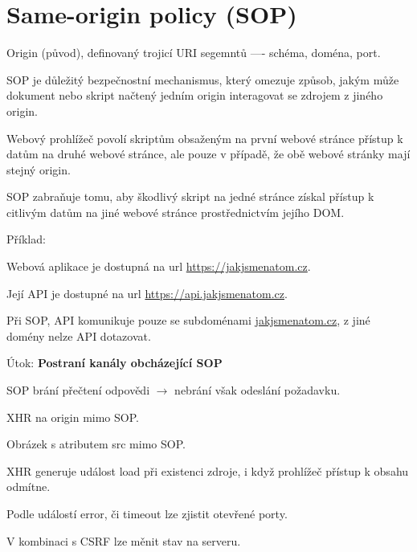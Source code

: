 
\section{Same-origin policy (SOP)}

\begin{compactitem}
    \item Origin (původ), definovaný trojicí URI segemntů ---- schéma, doména, port.

    \item SOP je důležitý bezpečnostní mechanismus, který omezuje způsob, jakým může dokument nebo skript načtený jedním origin interagovat se zdrojem z jiného origin. \begin{compactitem}
        \item Webový prohlížeč povolí skriptům obsaženým na první webové stránce přístup k datům na druhé webové stránce, ale pouze v případě, že obě webové stránky mají stejný origin.
    \end{compactitem}

    \item SOP zabraňuje tomu, aby škodlivý skript na jedné stránce získal přístup k citlivým datům na jiné webové stránce prostřednictvím jejího DOM.

    \item Příklad: \begin{compactitem}
        \item Webová aplikace je dostupná na url \url{https://jakjsmenatom.cz}.
        \item Její API je dostupné na url \url{https://api.jakjsmenatom.cz}.
        \item Při SOP, API komunikuje pouze se subdoménami \url{jakjsmenatom.cz}, z jiné domény nelze API dotazovat.
    \end{compactitem}

    \item Útok: \textbf{Postraní kanály obcházející SOP} \begin{compactitem}
        \item SOP brání přečtení odpovědi $\rightarrow$ nebrání však odeslání požadavku. \begin{compactitem}
            \item XHR na origin mimo SOP.
            \item Obrázek s atributem src mimo SOP.
        \end{compactitem}
        \item XHR generuje událost load při existenci zdroje, i když prohlížeč přístup k obsahu odmítne. \begin{compactitem}
            \item Podle událostí error, či timeout lze zjistit otevřené porty.
        \end{compactitem}
        \item V kombinaci s CSRF lze měnit stav na serveru.
    \end{compactitem}
\end{compactitem}

